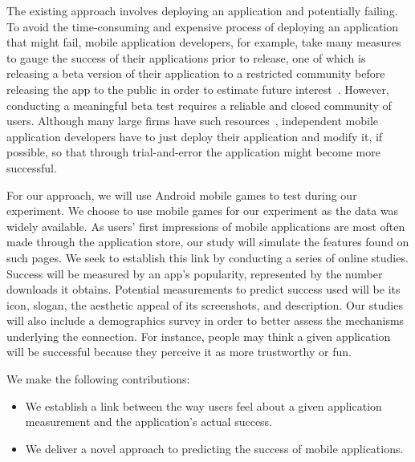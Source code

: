 The existing approach involves deploying an application and potentially failing. To avoid the time-consuming and expensive process of deploying an application that might fail, mobile application developers, for example, take many measures to gauge the success of their applications prior to release, one of which is releasing a beta version of their application to a restricted community before releasing the app to the public in order to estimate future interest~\cite{needsource}. However, conducting a meaningful beta test requires a reliable and closed community of users. Although many large firms have such resources~\cite{needsource}, independent mobile application developers have to just deploy their application and modify it, if possible, so that through trial-and-error the application might become more successful.

For our approach, we will use Android mobile games to test during our experiment. We choose to use mobile games for our experiment as the data was widely available. As users' first impressions of mobile applications are most often made through the application store, our study will simulate the features found on such pages. We seek to establish this link by conducting a series of online studies. Success will be measured by an app's popularity, represented by the number downloads it obtains. Potential measurements to predict success used will be its icon, slogan, the aesthetic appeal of its screenshots, and description. Our studies will also include a demographics survey in order to better assess the mechanisms underlying the connection. For instance, people may think a given application will be successful because they perceive it as more trustworthy or fun.

We make the following contributions:
\begin{itemize}
\item We establish a link between the way users feel about a given application measurement and the application's actual success.
\item We deliver a novel approach to predicting the success of mobile applications.
\end{itemize}

